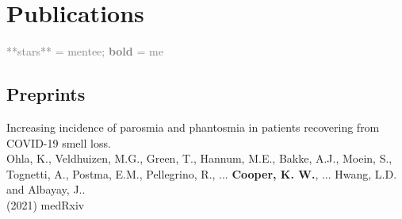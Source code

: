 \documentclass[10pt]{cooperCV2}
\begin{document}

\needspace{\headerpush}
\section{Publications}
\textcolor{grey}{**stars** = mentee; \textbf{bold} = me}\\

 
 
	

\subsection{Preprints} 
\begin{etaremune}[itemindent=-1.5\bibhang, topsep=0pt,
				   itemsep=\bibsep,partopsep=0pt,parsep=0pt,leftmargin={\bibhang+\widthof{[999]}}] 
    
    \item Increasing incidence of parosmia and phantosmia in patients recovering from COVID-19 smell loss. \\
     Ohla, K., Veldhuizen, M.G., Green, T., Hannum, M.E., Bakke, A.J., Moein, S., Tognetti, A., Postma, E.M., Pellegrino, R., ... \textbf{Cooper, K. W.}, ... Hwang, L.D. and Albayay, J.. \\ (2021) medRxiv 
     
	

\end{etaremune}

 

	
\end{document}
